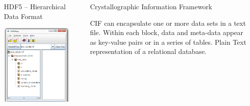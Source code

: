\documentclass[final]{beamer}
\begin{document}
\begin{frame}{}
\begin{columns}[t]
\begin{column}{.31\linewidth}
\begin{block}{HDF5 -- Hierarchical Data Format}
         \vspace{6mm}

         \begin{center}
           \includegraphics[width=0.62\linewidth]{hdf5.png}
         \end{center}

         \vspace{10mm} {\ }   \vspace{10mm} {\ }

        \end{block}
      \end{column}
      \begin{column}{.01\linewidth}
      \end{column}
      \begin{column}{.34\linewidth}
        \begin{block}{Crystallographic Information Framework}

          \justifying CIF can encapsulate one or more data sets in a text
          file.  Within each block, data and meta-data appear as key-value
          pairs or in a series of tables.  Plain Text representation of a
          relational database.

         \vspace{2mm} {\ }


\end{block}
\end{column}
\end{columns}
\end{frame}
\end{document}
